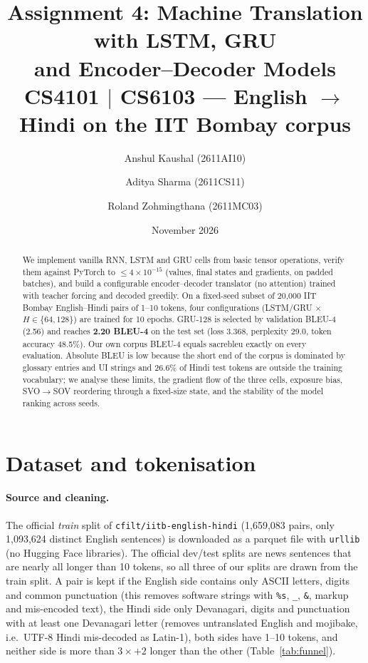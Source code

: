 \documentclass[10pt,a4paper]{article}
\title{\textbf{Assignment 4: Machine Translation with LSTM, GRU\\and Encoder--Decoder Models}\\[2pt]
\large CS4101 $|$ CS6103 --- English $\rightarrow$ Hindi on the IIT Bombay corpus}
\author{Anshul Kaushal (2611AI10) \and Aditya Sharma (2611CS11) \and Roland Zohmingthana (2611MC03)}
\date{November 2026}
\newcommand{\code}[1]{\texttt{#1}}
\begin{document}
\maketitle

\begin{abstract}
\noindent We implement vanilla RNN, LSTM and GRU cells from basic tensor operations, verify them
against PyTorch to $\le 4\times10^{-15}$ (values, final states and gradients, on padded batches), and
build a configurable encoder--decoder translator (no attention) trained with teacher forcing and decoded
greedily. On a fixed-seed subset of 20{,}000 IIT Bombay English--Hindi pairs of 1--10 tokens, four
configurations (LSTM/GRU $\times$ $H\in\{64,128\}$) are trained for 10 epochs. GRU-128 is selected by
validation BLEU-4 (2.56) and reaches \textbf{2.20 BLEU-4} on the test set (loss 3.368, perplexity 29.0,
token accuracy 48.5\%). Our own corpus BLEU-4 equals sacrebleu exactly on every evaluation. Absolute
BLEU is low because the short end of the corpus is dominated by glossary entries and UI strings and
26.6\% of Hindi test tokens are outside the training vocabulary; we analyse these limits, the gradient flow
of the three cells, exposure bias, SVO$\to$SOV reordering through a fixed-size state, and the stability of
the model ranking across seeds.
\end{abstract}

\section{Dataset and tokenisation}

\paragraph{Source and cleaning.} The official \emph{train} split of \code{cfilt/iitb-english-hindi}
(1{,}659{,}083 pairs, only 1{,}093{,}624 distinct English sentences) is downloaded as a parquet file with
\code{urllib} (no Hugging Face libraries). The official dev/test splits are news sentences that are
nearly all longer than 10 tokens, so all three of our splits are drawn from the train split. A pair is
kept if the English side contains only ASCII letters, digits and common punctuation (this removes
software strings with \code{\%s}, \code{\_}, \code{\&}, markup and mis-encoded text), the Hindi side only
Devanagari, digits and punctuation with at least one Devanagari letter (removes untranslated English and
mojibake, i.e.\ UTF-8 Hindi mis-decoded as Latin-1), both sides have 1--10 tokens, and neither side is more than $3\times+2$ longer
than the other (Table~\ref{tab:funnel}).
\end{document}
